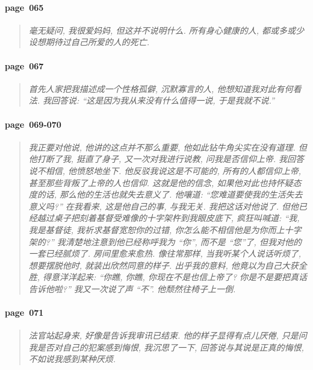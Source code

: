 \paragraph*{page~065}
\begin{quotation}
    \itshape
    毫无疑问, 我很爱妈妈, 但这并不说明什么. 所有身心健康的人, 都或多或少设想期待过自己所爱的人的死亡.
\end{quotation}

\paragraph*{page~067}
\begin{quotation}
    \itshape
    首先人家把我描述成一个性格孤僻, 沉默寡言的人, 他想知道我对此有何看法. 我回答说: ``这是因为我从来没有什么值得一说, 于是我就不说.''
\end{quotation}

\paragraph*{page~069-070}
\begin{quotation}
    \itshape
    我正要对他说, 他讲的这点并不那么重要, 他如此钻牛角尖实在没有道理. 但他打断了我, 挺直了身子, 又一次对我进行说教, 问我是否信仰上帝. 我回答说不相信, 他愤怒地坐下. 他反驳我说这是不可能的, 所有的人都信仰上帝, 甚至那些背叛了上帝的人也信仰. 这就是他的信念, 如果他对此也持怀疑态度的话, 那么他的生活也就失去意义了. 他嚷道: ``您难道要使我的生活失去意义吗?'' 在我看来, 这是他自己的事, 与我无关. 我把这话对他说了. 但他已经越过桌子把刻着基督受难像的十字架杵到我眼皮底下, 疯狂叫喊道: ``我, 我是基督徒, 我祈求基督宽恕你的过错, 你怎么能不相信他是为你而上十字架的?'' 我清楚地注意到他已经称呼我为 ``你'', 而不是 ``您''了, 但我对他的一套已经腻烦了. 房间里愈来愈热. 像往常那样, 当我听某个人说话听烦了, 想要摆脱他时, 就装出欣然同意的样子. 出乎我的意料, 他竟以为自己大获全胜, 得意洋洋起来: ``你瞧, 你瞧, 你现在不是也信上帝了? 你是不是要把真话告诉他啦?'' 我又一次说了声 ``不''. 他颓然往椅子上一倒. 
\end{quotation}


\paragraph*{page~071}
\begin{quotation}
    \itshape
    法官站起身来, 好像是告诉我审讯已结束. 他的样子显得有点儿厌倦, 只是问我是否对自己的犯案感到悔恨, 我沉思了一下, 回答说与其说是正真的悔恨, 不如说我感到某种厌烦. 
\end{quotation}



